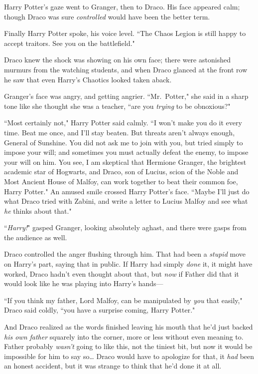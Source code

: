 Harry Potter's gaze went to Granger, then to Draco. His face appeared calm; though Draco was sure \emph{controlled} would have been the better term.

Finally Harry Potter spoke, his voice level. ``The Chaos Legion is still happy to accept traitors. See you on the battlefield."

Draco knew the shock was showing on his own face; there were astonished murmurs from the watching students, and when Draco glanced at the front row he saw that even Harry's Chaotics looked taken aback.

Granger's face was angry, and getting angrier. ``Mr.~Potter," she said in a sharp tone like she thought she was a teacher, ``are you \emph{trying} to be obnoxious?"

``Most certainly not," Harry Potter said calmly. ``I won't make you do it every time. Beat me once, and I'll stay beaten. But threats aren't always enough, General of Sunshine. You did not ask me to join with you, but tried simply to impose your will; and sometimes you must actually defeat the enemy, to impose your will on him. You see, I am skeptical that Hermione Granger, the brightest academic star of Hogwarts, and Draco, son of Lucius, scion of the Noble and Most Ancient House of Malfoy, can work together to beat their common foe, Harry Potter." An amused smile crossed Harry Potter's face. ``Maybe I'll just do what Draco tried with Zabini, and write a letter to Lucius Malfoy and see what \emph{he} thinks about that."

``\emph{Harry!}" gasped Granger, looking absolutely aghast, and there were gasps from the audience as well.

Draco controlled the anger flushing through him. That had been a \emph{stupid} move on Harry's part, saying that in public. If Harry had simply \emph{done} it, it might have worked, Draco hadn't even thought about that, but \emph{now} if Father did that it would look like he was playing into Harry's hands---

``If you think my father, Lord Malfoy, can be manipulated by \emph{you} that easily," Draco said coldly, ``you have a surprise coming, Harry Potter."

And Draco realized as the words finished leaving his mouth that he'd just backed \emph{his own father} squarely into the corner, more or less without even meaning to. Father probably \emph{wasn't} going to like this, not the tiniest bit, but now it would be impossible for him to say so{\ldots} Draco would have to apologize for that, it \emph{had} been an honest accident, but it was strange to think that he'd done it at all.

